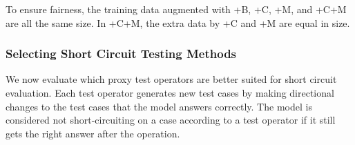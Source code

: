 To ensure fairness, the training data augmented with +B, +C, +M, and +C+M are
all the same size. In +C+M, the extra data by +C and +M are equal in size. 

\iffalse

\subsubsection{Selecting Short Circuit Testing Methods}
\label{sec:select-sc}
We now evaluate which proxy test operators are better suited for short circuit evaluation.
Each test operator generates new test cases by making directional changes to
the test cases that the model answers correctly. 
The model is considered not short-circuiting on a case according 
to a test operator if it still gets the right answer after the operation. 

